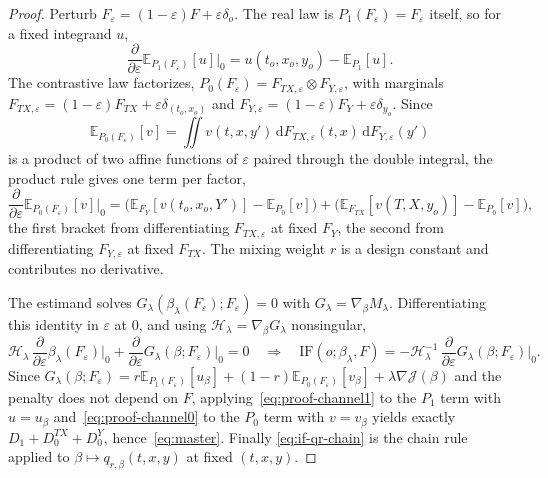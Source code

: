 \documentclass[11pt]{article}
\newcommand{\Eb}{\mathbb{E}}
\newcommand{\IF}{\mathrm{IF}}
\newcommand{\Hb}{\mathcal{H}}
\begin{document}
\begin{proof}
Perturb $F_\varepsilon=(1-\varepsilon)F+\varepsilon\delta_o$. The real law is
$P_1(F_\varepsilon)=F_\varepsilon$ itself, so for a fixed integrand $u$,
\begin{equation}
\frac{\partial}{\partial\varepsilon}\Eb_{P_1(F_\varepsilon)}[u]\Big|_{0}
= u(t_o,x_o,y_o)-\Eb_{P_1}[u].
\label{eq:proof-channel1}
\end{equation}
The contrastive law factorizes, $P_0(F_\varepsilon)=F_{TX,\varepsilon}\otimes
F_{Y,\varepsilon}$, with marginals
$F_{TX,\varepsilon}=(1-\varepsilon)F_{TX}+\varepsilon\delta_{(t_o,x_o)}$ and
$F_{Y,\varepsilon}=(1-\varepsilon)F_Y+\varepsilon\delta_{y_o}$. Since
\[
\Eb_{P_0(F_\varepsilon)}[v]=\iint v(t,x,y')\,\mathrm dF_{TX,\varepsilon}(t,x)\,\mathrm dF_{Y,\varepsilon}(y')
\]
is a product of two affine functions of $\varepsilon$ paired through the double
integral, the product rule gives one term per factor,
\begin{equation}
\frac{\partial}{\partial\varepsilon}\Eb_{P_0(F_\varepsilon)}[v]\Big|_{0}
= \big(\Eb_{F_Y}[v(t_o,x_o,Y')]-\Eb_{P_0}[v]\big)
+ \big(\Eb_{F_{TX}}[v(T,X,y_o)]-\Eb_{P_0}[v]\big),
\label{eq:proof-channel0}
\end{equation}
the first bracket from differentiating $F_{TX,\varepsilon}$ at fixed $F_Y$, the
second from differentiating $F_{Y,\varepsilon}$ at fixed $F_{TX}$. The mixing weight
$r$ is a design constant and contributes no derivative.

The estimand solves $G_\lambda(\beta_\lambda(F_\varepsilon);F_\varepsilon)=0$ with
$G_\lambda=\nabla_\beta M_\lambda$. Differentiating this identity in $\varepsilon$ at
$0$, and using $\Hb_\lambda=\nabla_\beta G_\lambda$ nonsingular,
\[
\Hb_\lambda\,\frac{\partial}{\partial\varepsilon}\beta_\lambda(F_\varepsilon)\Big|_0
+ \frac{\partial}{\partial\varepsilon}G_\lambda(\beta;F_\varepsilon)\Big|_0 = 0
\quad\Longrightarrow\quad
\IF(o;\beta_\lambda,F) = -\Hb_\lambda^{-1}\,\frac{\partial}{\partial\varepsilon}G_\lambda(\beta;F_\varepsilon)\Big|_0.
\]
Since $G_\lambda(\beta;F_\varepsilon)=r\Eb_{P_1(F_\varepsilon)}[u_\beta]+(1-r)\Eb_{P_0(F_\varepsilon)}[v_\beta]+\lambda\nabla\mathcal{J}(\beta)$
and the penalty does not depend on $F$, applying~\eqref{eq:proof-channel1} to the
$P_1$ term with $u=u_\beta$ and~\eqref{eq:proof-channel0} to the $P_0$ term with
$v=v_\beta$ yields exactly $D_1+D_0^{TX}+D_0^{Y}$, hence~\eqref{eq:master}. Finally
\eqref{eq:if-qr-chain} is the chain rule applied to $\beta\mapsto q_{r,\beta}(t,x,y)$
at fixed $(t,x,y)$.
\end{proof}
\end{document}
